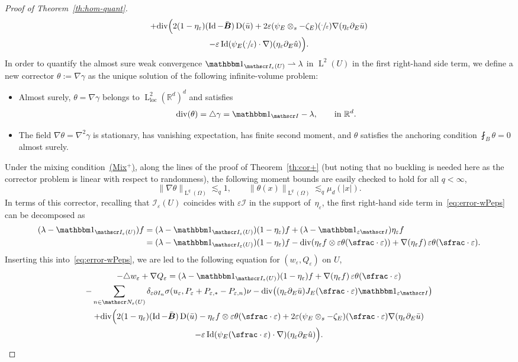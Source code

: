 \documentclass[JEP,XML,SOM,Unicode,published]{cedram}
\let\mathcal\mathscr
\newcommand{\Mix}{\hyperref[Mix+]{\textup{(Mix$^+$)}}\xspace}
\let\mathds\mathbbm
\theoremstyle{plain}
\theoremstyle{definition}
\newcommand{\e}{\varepsilon}
\newcommand{\R}{\mathbb R}
\newcommand{\Ic}{\mathcal I}
\newcommand{\Nc}{\mathcal N}
\newcommand{\cvf}{\rightharpoonup}
\newcommand{\loc}{{\operatorname{loc}}}
\newcommand{\Id}{\operatorname{Id}}
\newcommand{\D}{\operatorname{D}}
\newcommand{\Bb}{\bar{\boldsymbol B}}
\newcommand{\Ld}{\operatorname{L}}
\newcommand{\Div}{{\operatorname{div}}}
\begin{document}
\begin{proof}[Proof of Theorem~\ref{th:hom-quant}]
\begin{multline}
+\Div\Big(2(1-\eta_\e)(\Id-\Bb)\D(\bar u)+2\e(\psi_E\otimes_s-\zeta_E)(\sfrac\cdot\e)\nabla(\eta_\e\partial_E\bar u)\\
-\e\Id(\psi_E(\sfrac\cdot\e)\cdot\nabla)(\eta_\e\partial_E\hat u)\Big).
\end{multline}
In order to quantify the almost sure weak convergence $\mathds1_{\Ic_\e(U)}\cvf\lambda$ in $\Ld^2(U)$ in the first right-hand side term, we define a new corrector $\theta:=\nabla\gamma$ as the unique solution of the following infinite-volume problem:
\begin{itemize}
\item Almost surely, $\theta=\nabla\gamma$ belongs to $\Ld^2_\loc(\R^d)^d$ and satisfies
\[\Div(\theta)=\triangle\gamma=\mathds1_{\Ic}-\lambda,\qquad\text{in $\R^d$}.\]
\item The field $\nabla\theta=\nabla^2\gamma$ is stationary, has vanishing expectation, has finite second moment, and $\theta$ satisfies the anchoring condition $\fint_B\theta=0$ almost surely.
\end{itemize}
Under the mixing condition~\Mix, along the lines of the proof of Theorem~\ref{th:cor+} (but noting that no buckling is needed here as the corrector problem is linear with respect to randomness),
the following moment bounds are easily checked to hold for all $q<\infty$,
\begin{equation}\label{eq:bnd-gam}
\|\nabla\theta\|_{\Ld^q(\Omega)}\lesssim_q 1,
\qquad
\|\theta(x)\|_{\Ld^q(\Omega)}\lesssim_q \mu_d(|x|).
\end{equation}
In terms of this corrector, recalling that $\Ic_\e(U)$ coincides with $\e\Ic$ in the support of~$\eta_\e$, the first right-hand side term in~\eqref{eq:error-wPeps} can be decomposed as
\begin{align*}
(\lambda-\mathds1_{\Ic_\e(U)})f&= (\lambda-\mathds1_{\Ic_\e(U)})(1-\eta_\e)f+(\lambda-\mathds1_{\e\Ic})\eta_\e f\\
&= (\lambda-\mathds1_{\Ic_\e(U)})(1-\eta_\e)f-\Div(\eta_\e f\otimes \e\theta(\sfrac\cdot\e))+\nabla(\eta_\e f)\,\e\theta(\sfrac\cdot\e).
\end{align*}
Inserting this into~\eqref{eq:error-wPeps}, we are led to the following equation for $(w_\e,Q_\e)$ on $U$,
\begin{multline}\label{eq:error-wPeps+}
-\triangle w_\e+\nabla Q_\e=(\lambda-\mathds1_{\Ic_\e(U)})(1-\eta_\e)f+\nabla(\eta_\e f)\,\e\theta(\sfrac\cdot\e)\\
-\sum_{n\in\Nc_\e(U)}\delta_{\e\partial I_n}\sigma(u_\e,P_\e+P_{\e,*}-P_{\e,n})\nu
-\Div\big((\eta_\e\partial_E\bar u)J_E(\sfrac\cdot\e)\mathds1_{\e\Ic}\big)\\
+\Div\Big(2(1-\eta_\e)(\Id-\Bb)\D(\bar u)-\eta_\e f\otimes \e\theta(\sfrac\cdot\e)
+2\e(\psi_E\otimes_s-\zeta_E)(\sfrac\cdot\e)\nabla(\eta_\e\partial_E\bar u)\\
-\e\Id(\psi_E(\sfrac\cdot\e)\cdot\nabla)(\eta_\e\partial_E\hat u)\Big).
\end{multline}


\end{proof}
\end{document}
